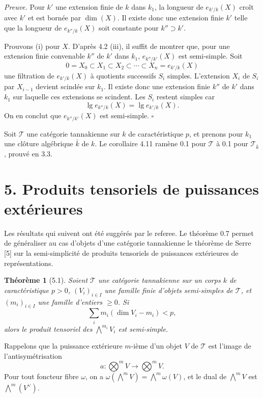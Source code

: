 \documentclass[10pt]{article}
\newcommand{\T}{\mathcal T}
\theoremstyle{deligne}
\newtheorem*{theorem*}{Théorème}
\newenvironment{proofdel}{\textit{Preuve.}}{\hfill$\square$}
\newcommand{\heading}[1]{\vspace{0.7em}\noindent{\bfseries #1}\quad}
\begin{document}
\begin{proofdel}
Pour \(k'\) une extension finie de \(k\) dans \(k_1\), la longueur de \(e_{k'/k}(X)\) croît avec \(k'\) et est bornée par \(\dim(X)\). Il existe donc une extension finie \(k'\) telle que la longueur de \(e_{k''/k}(X)\) soit constante pour \(k''\supset k'\).

Prouvons (i) pour \(X\). D'après 4.2 (iii), il suffit de montrer que, pour une extension finie convenable \(k''\) de \(k'\) dans \(k_1\), \(e_{k''/k'}(X)\) est semi-simple. Soit
\[
0=X_0\subset X_1\subset X_2\subset\cdots\subset X_n=e_{k'/k}(X)
\]
une filtration de \(e_{k'/k}(X)\) à quotients successifs \(S_i\) simples. L'extension \(X_i\) de \(S_i\) par \(X_{i-1}\) devient scindée sur \(k_1\). Il existe donc une extension finie \(k''\) de \(k'\) dans \(k_1\) sur laquelle ces extensions se scindent. Les \(S_i\) restent simples car
\[
\operatorname{lg} e_{k''/k}(X)=\operatorname{lg} e_{k'/k}(X).
\]
On en conclut que \(e_{k''/k'}(X)\) est semi-simple.
\end{proofdel}

\heading{4.12. Preuve de 0.1.}
Soit \(\T\) une catégorie tannakienne sur \(k\) de caractéristique \(p\), et prenons pour \(k_1\) une clôture algébrique \(\bar k\) de \(k\). Le corollaire 4.11 ramène 0.1 pour \(\T\) à 0.1 pour \(\T_{\bar k}\), prouvé en 3.3.

\section*{5. Produits tensoriels de puissances extérieures}

Les résultats qui suivent ont été suggérés par le referee. Le théorème 0.7 permet de généraliser au cas d'objets d'une catégorie tannakienne le théorème de Serre [5] sur la semi-simplicité de produits tensoriels de puissances extérieures de représentations.


\begin{theorem*}[5.1]
Soient \(\T\) une catégorie tannakienne sur un corps \(k\) de caractéristique \(p>0\), \((V_i)_{i\in I}\) une famille finie d'objets semi-simples de \(\T\), et \((m_i)_{i\in I}\) une famille d'entiers \(\ge 0\). Si
\[
\tag{5.1.1}
  \sum_i m_i(\dim V_i-m_i)<p,
\]
alors le produit tensoriel des \(\bigwedge^{m_i}V_i\) est semi-simple.
\end{theorem*}

Rappelons que la puissance extérieure \(m\)-ième d'un objet \(V\) de \(\T\) est l'image de l'antisymétrisation
\[
  a:\bigotimes^m V\longrightarrow \bigotimes^m V.
\]
Pour tout foncteur fibre \(\omega\), on a \(\omega(\bigwedge^m V)=\bigwedge^m\omega(V)\), et le dual de \(\bigwedge^m V\) est \(\bigwedge^m(V^\vee)\).
\end{document}
